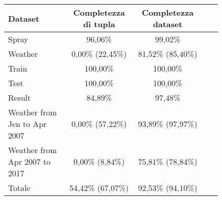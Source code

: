 \begin{figure}[H]
	\centering
	\begin{tabular}{lcccc}
		\toprule
		\textbf{Dataset} \quad & \textbf{Completezza di tupla} & \textbf{Completezza dataset} \\
				\midrule
		Spray &			96,06\%  	& 99,02\%  \\ 
		Weather &		0,00\% (22,45\%)		& 81,52\% (85,40\%) \\ 
		Train &			100,00\% 	& 100,00\%   \\ 
		Test &			100,00\% 	& 100,00\%   \\ 
		Result &		84,89\%  	& 97,48\%  \\ 
		Weather from Jen to Apr 2007 &	0,00\% (57,22\%)&	93,89\% (97,97\%) \\ 
		Weather from Apr 2007 to 2017 &		0,00\% (8,84\%)&	75,81\% (78,84\%)\\ 
		\midrule
		Totale &	    54,42\% (67,07\%) 	& 92,53\% (94,10\%) \\
		\bottomrule
	\end{tabular}
	\label{tab:completezza totale}
\end{figure}

